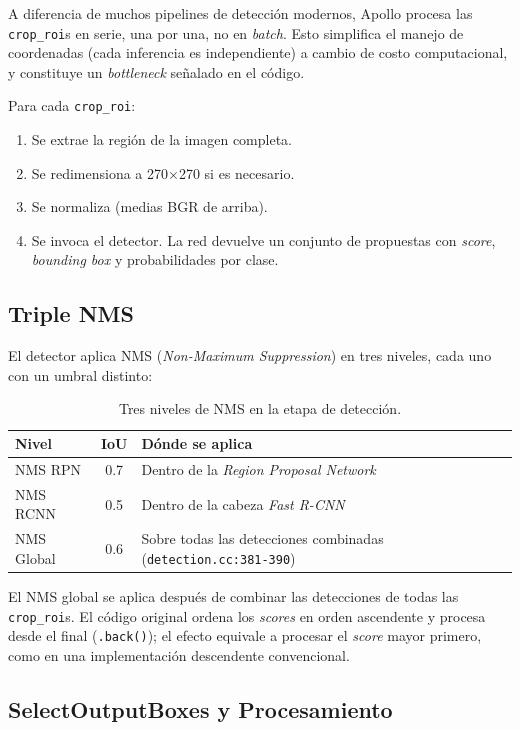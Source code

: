 A diferencia de muchos pipelines de detección modernos, Apollo procesa las \texttt{crop\_roi}s en serie, una por una, no en \textit{batch}. Esto simplifica el manejo de coordenadas (cada inferencia es independiente) a cambio de costo computacional, y constituye un \textit{bottleneck} señalado en el código.

Para cada \texttt{crop\_roi}:

\begin{enumerate}
    \item Se extrae la región de la imagen completa.
    \item Se redimensiona a 270$\times$270 si es necesario.
    \item Se normaliza (medias BGR de arriba).
    \item Se invoca el detector. La red devuelve un conjunto de propuestas con \textit{score}, \textit{bounding box} y probabilidades por clase.
\end{enumerate}

\subsection{Triple NMS}

El detector aplica NMS (\textit{Non-Maximum Suppression}) en tres niveles, cada uno con un umbral distinto:

\begin{table}[H]
\centering
\begin{tabular}{|l|c|l|}
\hline
\textbf{Nivel} & \textbf{IoU} & \textbf{Dónde se aplica} \\
\hline
NMS RPN & 0.7 & Dentro de la \textit{Region Proposal Network} \\
\hline
NMS RCNN & 0.5 & Dentro de la cabeza \textit{Fast R-CNN} \\
\hline
NMS Global & 0.6 & Sobre todas las detecciones combinadas (\texttt{detection.cc:381-390}) \\
\hline
\end{tabular}
\caption{Tres niveles de NMS en la etapa de detección.}
\end{table}

El NMS global se aplica después de combinar las detecciones de todas las \texttt{crop\_roi}s. El código original ordena los \textit{scores} en orden ascendente y procesa desde el final (\texttt{.back()}); el efecto equivale a procesar el \textit{score} mayor primero, como en una implementación descendente convencional.

\subsection{SelectOutputBoxes y Procesamiento}

